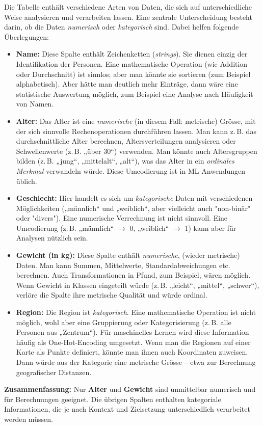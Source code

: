 \begin{aufgabe}{1}
Die Tabelle enthält verschiedene Arten von Daten, die sich auf unterschiedliche Weise analysieren und verarbeiten lassen. Eine zentrale Unterscheidung besteht darin, ob die Daten \emph{numerisch} oder \emph{kategorisch} sind. Dabei helfen folgende Überlegungen:

\begin{itemize}
    \item \textbf{Name:} Diese Spalte enthält Zeichenketten (\textit{strings}). Sie dienen einzig der Identifikation der Personen. Eine mathematische Operation (wie Addition oder Durchschnitt) ist sinnlos; aber man könnte sie sortieren (zum Beispiel alphabetisch). Aber hätte man deutlich mehr Einträge, dann wäre eine statistische Auswertung möglich, zum Beispiel eine Analyse nach Häufigkeit von Namen.
    
    \item \textbf{Alter:} Das Alter ist eine \emph{numerische} (in diesem Fall: metrische) Grösse, mit der sich sinnvolle Rechenoperationen durchführen lassen. Man kann z.\,B. das durchschnittliche Alter berechnen, Altersverteilungen analysieren oder Schwellenwerte (z.\,B. „über 30“) verwenden. Man könnte auch Altersgruppen bilden (z.\,B. „jung“, „mittelalt“, „alt“), was das Alter in ein \emph{ordinales Merkmal} verwandeln würde. Diese Umcodierung ist in ML-Anwendungen üblich.

    \item \textbf{Geschlecht:} Hier handelt es sich um \emph{kategorische} Daten mit verschiedenen Möglichkeiten („männlich“ und „weiblich“, aber vielleicht auch "non-binär" oder "divers"). Eine numerische Verrechnung ist nicht sinnvoll. Eine  Umcodierung (z.\,B. „männlich“ $\rightarrow$ 0, „weiblich“ $\rightarrow$ 1) kann aber für Analysen nützlich sein.

    \item \textbf{Gewicht (in kg):} Diese Spalte enthält \emph{numerische}, (wieder metrische) Daten. Man kann Summen, Mittelwerte, Standardabweichungen etc. berechnen. Auch Transformationen in Pfund, zum Beispiel, wären möglich. Wenn Gewicht in Klassen eingeteilt würde (z.\,B. „leicht“, „mittel“, „schwer“), verlöre die Spalte ihre metrische Qualität und würde ordinal.

    \item \textbf{Region:} Die Region ist \emph{kategorisch}. Eine mathematische Operation ist nicht möglich, wohl aber eine Gruppierung oder Kategorisierung (z.\,B. alle Personen aus „Zentrum“). Für maschinelles Lernen wird diese Information häufig als One-Hot-Encoding umgesetzt. Wenn man die Regionen auf einer Karte als Punkte definiert, könnte man ihnen auch Koordinaten zuweisen. Dann würde aus der Kategorie eine metrische Grösse – etwa zur Berechnung geografischer Distanzen.
\end{itemize}

\textbf{Zusammenfassung:} Nur \textbf{Alter} und \textbf{Gewicht} sind unmittelbar numerisch und für Berechnungen geeignet. Die übrigen Spalten enthalten kategoriale Informationen, die je nach Kontext und Zielsetzung unterschiedlich verarbeitet werden müssen.
\end{aufgabe}

